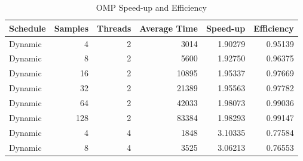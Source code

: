 \documentclass[journal,transmag]{IEEEtran}
\begin{document}
\section{}
	\begin{table}[h!]
		
		
		
		
		
		
		
		
	\centering
	\caption{OMP Speed-up and Efficiency}
	\label{table_omp_data}
	\begin{tabular}{|l|r|r|r|r|r|}
		\hline
		Schedule & \multicolumn{1}{l|}{Samples} & \multicolumn{1}{l|}{Threads} & \multicolumn{1}{l|}{Average Time} & \multicolumn{1}{l|}{Speed-up} & \multicolumn{1}{l|}{Efficiency} \\ \hline
		Dynamic       & 4                            & 2                            & 3014                              & 1.90279                       & 0.95139                         \\ \hline
		Dynamic       & 8                            & 2                            & 5600                              & 1.92750                       & 0.96375                         \\ \hline
		Dynamic       & 16                           & 2                            & 10895                             & 1.95337                       & 0.97669                         \\ \hline
		Dynamic       & 32                           & 2                            & 21389                             & 1.95563                       & 0.97782                         \\ \hline
		Dynamic       & 64                           & 2                            & 42033                             & 1.98073                       & 0.99036                         \\ \hline
		Dynamic       & 128                          & 2                            & 83384                             & 1.98293                       & 0.99147                         \\ \hline
		Dynamic       & 4                            & 4                            & 1848                              & 3.10335                       & 0.77584                         \\ \hline
		Dynamic       & 8                            & 4                            & 3525                              & 3.06213                       & 0.76553                         \\ \hline

\end{tabular}
\end{table}
\end{document}
